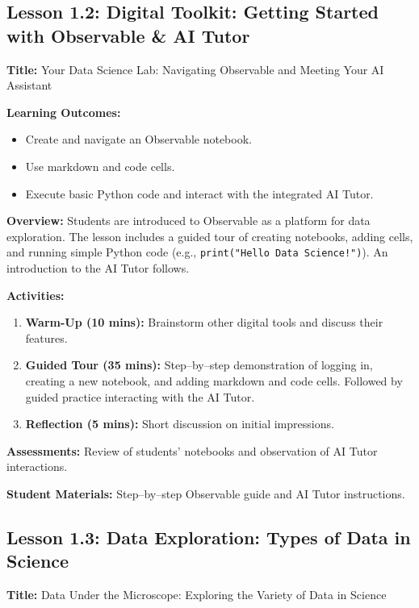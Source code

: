 \documentclass{tufte-book}
\begin{document}
\subsection{Lesson 1.2: Digital Toolkit: Getting Started with Observable \& AI Tutor}
\textbf{Title:} Your Data Science Lab: Navigating Observable and Meeting Your AI Assistant

\medskip
\textbf{Learning Outcomes:}
\begin{itemize}[leftmargin=*, label={\textbullet}]
    \item Create and navigate an Observable notebook.
    \item Use markdown and code cells.
    \item Execute basic Python code and interact with the integrated AI Tutor.
\end{itemize}

\medskip
\textbf{Overview:}  
Students are introduced to Observable as a platform for data exploration. The lesson includes a guided tour of creating notebooks, adding cells, and running simple Python code (e.g., \texttt{print("Hello Data Science!")}). An introduction to the AI Tutor follows.

\medskip
\textbf{Activities:}
\begin{enumerate}[label=\arabic*.]
    \item \textbf{Warm-Up (10 mins):} Brainstorm other digital tools and discuss their features.
    \item \textbf{Guided Tour (35 mins):} Step--by--step demonstration of logging in, creating a new notebook, and adding markdown and code cells. Followed by guided practice interacting with the AI Tutor.
    \item \textbf{Reflection (5 mins):} Short discussion on initial impressions.
\end{enumerate}

\medskip
\textbf{Assessments:}  
Review of students’ notebooks and observation of AI Tutor interactions.

\medskip
\textbf{Student Materials:}  
Step--by--step Observable guide and AI Tutor instructions.

\subsection{Lesson 1.3: Data Exploration: Types of Data in Science}
\textbf{Title:} Data Under the Microscope: Exploring the Variety of Data in Science
\end{document}
